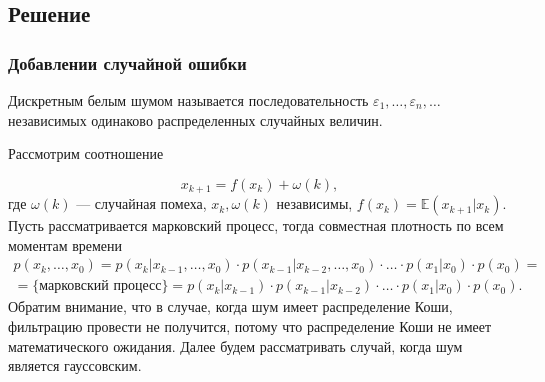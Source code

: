 \documentclass[11pt]{article}
\begin{document}
\subsection{Решение}
\subsubsection{Добавлении случайной ошибки}
\begin{opr}
	Дискретным белым шумом называется последовательность $\varepsilon_1,\dots,\varepsilon_n,\dots$ независимых одинаково распределенных случайных величин. 
\end{opr}
Рассмотрим соотношение

\[ x_{k+1} = f(x_k) + \omega(k),\]
где $\omega(k)$ --- случайная помеха, $x_k,\omega(k)$ независимы, $f(x_k) = \mathbb{E}(x_{k+1}|x_k).$ Пусть рассматривается марковский процесс, тогда совместная плотность по всем моментам времени
\begin{eqnarray*}
	p(x_k,\dots,x_0) = p(x_k|x_{k-1},\dots,x_0)\cdot p(x_{k-1}|x_{k-2},\dots,x_0) \cdot \dots \cdot p(x_1|x_0)\cdot p(x_0) = \\
	= \{\text{марковский процесс}\} = p(x_k|x_{k-1})\cdot p(x_{k-1}|x_{k-2})\cdot \dots \cdot p(x_1|x_0)\cdot p(x_0).
\end{eqnarray*}
Обратим внимание, что в случае, когда шум имеет распределение Коши, фильтрацию провести не получится, потому что распределение Коши не имеет математического ожидания. Далее будем рассматривать случай, когда шум является гауссовским.
\end{document}
